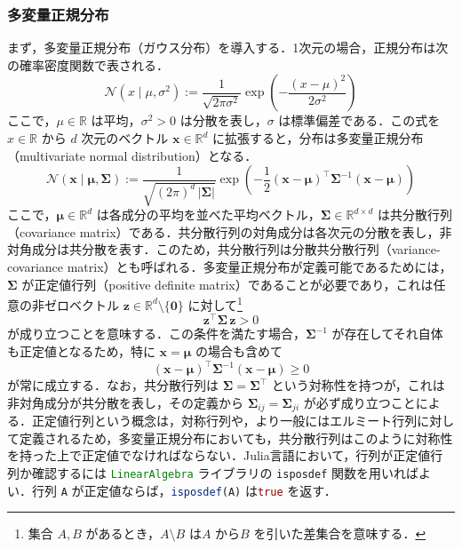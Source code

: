 \documentclass[titlepage]{ltjsbook}
\newcommand{\jl}{\lstinline[language=julia]}
\begin{document}
\subsubsection{多変量正規分布}
まず，多変量正規分布（ガウス分布）を導入する．1次元の場合，正規分布は次の確率密度関数で表される．
\begin{equation}
\mathcal{N}(x \mid \mu, \sigma^2) 
:= \frac{1}{\sqrt{2\pi \sigma^2}} \exp\left( -\frac{(x-\mu)^2}{2\sigma^2} \right)
\end{equation}
ここで，$\mu \in \mathbb{R}$ は平均，$\sigma^2 > 0$ は分散を表し，$\sigma$ は標準偏差である．この式を $x \in \mathbb{R}$ から $d$ 次元のベクトル $\mathbf{x} \in \mathbb{R}^d$ に拡張すると，分布は多変量正規分布（multivariate normal distribution）となる．
\begin{equation}
\mathcal{N}(\mathbf{x} \mid \boldsymbol{\mu}, \boldsymbol{\Sigma}) 
:= \frac{1}{\sqrt{(2\pi)^d \, |\boldsymbol{\Sigma}|}}
\exp\left( -\frac{1}{2} (\mathbf{x} - \boldsymbol{\mu})^\top \boldsymbol{\Sigma}^{-1} (\mathbf{x} - \boldsymbol{\mu}) \right)
\end{equation}
ここで，$\boldsymbol{\mu} \in \mathbb{R}^d$ は各成分の平均を並べた平均ベクトル，$\boldsymbol{\Sigma} \in \mathbb{R}^{d \times d}$ は共分散行列（covariance matrix）である．共分散行列の対角成分は各次元の分散を表し，非対角成分は共分散を表す．このため，共分散行列は分散共分散行列（variance-covariance matrix）とも呼ばれる．多変量正規分布が定義可能であるためには，$\boldsymbol{\Sigma}$ が正定値行列（positive definite matrix）であることが必要であり，これは任意の非ゼロベクトル $\mathbf{z} \in \mathbb{R}^d \setminus \{\mathbf{0}\}$ に対して\footnote{集合 $A, B$ があるとき，$A \setminus B$ は$A$ から$B$ を引いた差集合を意味する．}
\begin{equation}
\mathbf{z}^\top \boldsymbol{\Sigma} \, \mathbf{z} > 0
\end{equation}
が成り立つことを意味する．この条件を満たす場合，$\boldsymbol{\Sigma}^{-1}$ が存在してそれ自体も正定値となるため，特に $\mathbf{x} = \boldsymbol{\mu}$ の場合も含めて
\begin{equation}
(\mathbf{x} - \boldsymbol{\mu})^\top \boldsymbol{\Sigma}^{-1} (\mathbf{x} - \boldsymbol{\mu}) \geq 0
\end{equation}
が常に成立する．なお，共分散行列は $\boldsymbol{\Sigma} = \boldsymbol{\Sigma}^\top$ という対称性を持つが，これは非対角成分が共分散を表し，その定義から $\boldsymbol{\Sigma}_{ij} = \boldsymbol{\Sigma}_{ji}$ が必ず成り立つことによる．正定値行列という概念は，対称行列や，より一般にはエルミート行列に対して定義されるため，多変量正規分布においても，共分散行列はこのように対称性を持った上で正定値でなければならない．Julia言語において，行列が正定値行列か確認するには \jl{LinearAlgebra} ライブラリの \jl{isposdef} 関数を用いればよい．行列 \jl{A} が正定値ならば，\jl{isposdef(A)} は\jl{true} を返す．
\end{document}
